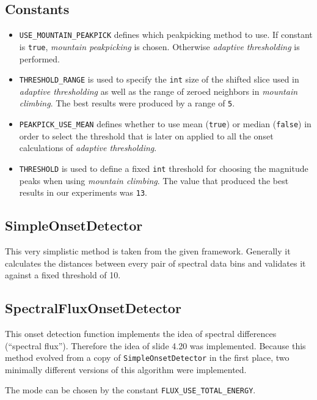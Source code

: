 \subsection*{Constants} \label{ssec:onsetconstants}
\begin{itemize}
  \item \texttt{USE\_MOUNTAIN\_PEAKPICK} defines which peakpicking method to
  use. If constant is \texttt{true}, \emph{mountain peakpicking} is chosen.
  Otherwise \emph{adaptive thresholding} is performed.
  \item \texttt{THRESHOLD\_RANGE} is used to specify the \texttt{int} size of
  the shifted slice used in \emph{adaptive thresholding} as well as the range of
  zeroed neighbors in \emph{mountain climbing}. The best results were produced
  by a range of \texttt{5}.
  \item \texttt{PEAKPICK\_USE\_MEAN} defines whether to use mean
  (\texttt{true}) or median (\texttt{false}) in order to select the threshold
  that is later on applied to all the onset calculations of \emph{adaptive
  thresholding}.
  \item \texttt{THRESHOLD} is used to define a fixed \texttt{int} threshold for
  choosing the magnitude peaks when using \emph{mountain climbing}. The value
  that produced the best results in our experiments was \texttt{13}. 
\end{itemize}

\subsection{\ttfamily SimpleOnsetDetector} \label{ssec:onsetsimple}
This very simplistic method is taken from the given framework. Generally it
calculates the distances between every pair of spectral data bins and validates
it against a fixed threshold of 10.

\subsection{\ttfamily SpectralFluxOnsetDetector} \label{ssec:onsetflux}
This onset detection function implements the idea of spectral differences
(``spectral flux''). Therefore the idea of slide 4.20 was implemented. Because
this method evolved from a copy of \texttt{SimpleOnsetDetector} in the first
place, two minimally different versions of this algorithm were implemented.

The mode can be chosen by the constant \texttt{FLUX\_USE\_TOTAL\_ENERGY}.

